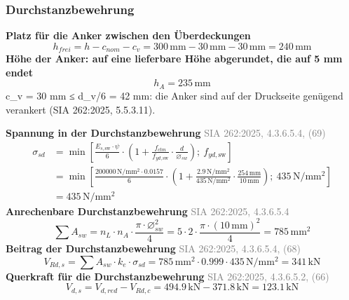 \documentclass[11pt,a4paper]{article}
\newcommand{\normref}[1]{{\small\textcolor{gray}{#1}}}
\begin{document}
\subsubsection{Durchstanzbewehrung}
\noindent\textbf{Platz für die Anker zwischen den Überdeckungen}
\begin{equation*}
h_{frei} = h - c_{nom} - c_v = 300\,\mathrm{mm} - 30\,\mathrm{mm} - 30\,\mathrm{mm} = 240\,\mathrm{mm}
\end{equation*}
\noindent\textbf{Höhe der Anker: auf eine lieferbare Höhe abgerundet, die auf 5 mm endet}
\begin{equation*}
h_A = 235\,\mathrm{mm}
\end{equation*}
c\_v = 30 mm ≤ d\_v/6 = 42 mm: die Anker sind auf der Druckseite genügend verankert (SIA 262:2025, 5.5.3.11).

\noindent\textbf{Spannung in der Durchstanzbewehrung} \hfill \normref{SIA 262:2025, 4.3.6.5.4, (69)}
\begin{equation*}
\begin{aligned}
  \sigma_{sd} &= \min\left[\frac{E_{s,\text{sw}} \cdot \psi}{6} \cdot \left(1 + \frac{f_{ctm}}{f_{yd,\text{sw}}} \cdot \frac{d}{\varnothing_{sw}}\right);\ f_{yd,\text{sw}}\right] \\
  &= \min\left[\frac{200000\,\mathrm{N}/\mathrm{mm}^{2} \cdot 0.0157}{6} \cdot \left(1 + \frac{2.9\,\mathrm{N}/\mathrm{mm}^{2}}{435\,\mathrm{N}/\mathrm{mm}^{2}} \cdot \frac{254\,\mathrm{mm}}{10\,\mathrm{mm}}\right);\ 435\,\mathrm{N}/\mathrm{mm}^{2}\right] \\
  &= 435\,\mathrm{N}/\mathrm{mm}^{2}
\end{aligned}
\end{equation*}
\noindent\textbf{Anrechenbare Durchstanzbewehrung} \hfill \normref{SIA 262:2025, 4.3.6.5.4}
\begin{equation*}
\sum A_{sw} = n_L \cdot n_A \cdot \frac{\pi \cdot \varnothing_{sw}^{2}}{4} = 5 \cdot 2 \cdot \frac{\pi \cdot \left(10\,\mathrm{mm}\right)^{2}}{4} = 785\,\mathrm{mm}^{2}
\end{equation*}
\noindent\textbf{Beitrag der Durchstanzbewehrung} \hfill \normref{SIA 262:2025, 4.3.6.5.4, (68)}
\begin{equation*}
V_{Rd,s} = \sum A_{sw} \cdot k_e \cdot \sigma_{sd} = 785\,\mathrm{mm}^{2} \cdot 0.999 \cdot 435\,\mathrm{N}/\mathrm{mm}^{2} = 341\,\mathrm{kN}
\end{equation*}
\noindent\textbf{Querkraft für die Durchstanzbewehrung} \hfill \normref{SIA 262:2025, 4.3.6.5.2, (66)}
\begin{equation*}
V_{d,s} = V_{d,red} - V_{Rd,c} = 494.9\,\mathrm{kN} - 371.8\,\mathrm{kN} = 123.1\,\mathrm{kN}
\end{equation*}
\end{document}
